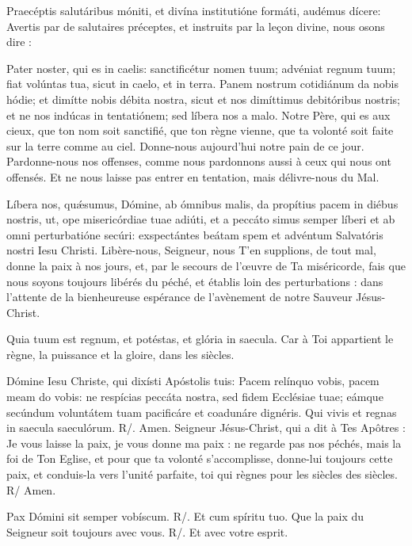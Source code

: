 Praecéptis salutáribus móniti, et divína institutióne formáti, audémus dícere:
Avertis par de salutaires préceptes, et instruits par la leçon divine, nous osons dire :

Pater noster, qui es in caelis: sanctificétur nomen tuum; advéniat regnum tuum; fiat volúntas tua, sicut in caelo, et in terra. Panem nostrum cotidiánum da nobis hódie; et dimítte nobis débita nostra, sicut et nos dimíttimus debitóribus nostris; et ne nos indúcas in tentatiónem; sed líbera nos a malo.
Notre Père, qui es aux cieux, que ton nom soit sanctifié, que ton règne vienne, que ta volonté soit faite sur la terre comme au ciel. Donne-nous  aujourd’hui notre pain de ce jour. Pardonne-nous nos offenses, comme nous pardonnons aussi à ceux qui nous ont offensés. Et ne nous laisse pas entrer en tentation, mais délivre-nous du Mal.

Líbera nos, quǽsumus, Dómine, ab ómnibus malis, da propítius pacem in diébus nostris, ut, ope misericórdiae tuae adiúti, et a peccáto simus semper líberi et ab omni perturbatióne secúri: exspectántes beátam spem et advéntum Salvatóris nostri Iesu Christi.
Libère-nous, Seigneur, nous T’en supplions, de tout mal, donne la paix à nos jours, et, par le secours de l’œuvre de Ta miséricorde, fais que nous soyons toujours libérés du péché, et établis loin des perturbations : dans l’attente de la bienheureuse espérance de l’avènement de notre Sauveur Jésus-Christ.

Quia tuum est regnum, et potéstas, et glória in saecula.
Car à Toi appartient le règne, la puissance et la gloire, dans les siècles.

Dómine Iesu Christe, qui dixísti Apóstolis tuis: Pacem relínquo vobis, pacem meam do vobis: ne respícias peccáta nostra, sed fidem Ecclésiae tuae; eámque secúndum voluntátem tuam pacificáre et coadunáre dignéris. Qui vivis et regnas in saecula saeculórum. R/. Amen.
Seigneur Jésus-Christ, qui a dit à Tes Apôtres : Je vous laisse la paix, je vous donne ma paix : ne regarde pas nos péchés, mais la foi de Ton Eglise, et pour que ta volonté s’accomplisse, donne-lui toujours cette paix, et conduis-la vers l’unité parfaite, toi qui règnes pour les siècles des siècles.
R/ Amen.

Pax Dómini sit semper vobíscum.
R/. Et cum spíritu tuo.
Que la paix du Seigneur soit toujours avec vous.
R/. Et avec votre esprit.
